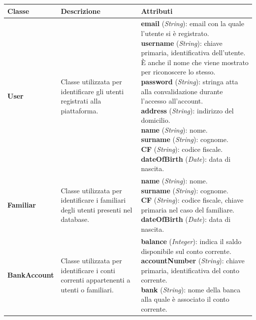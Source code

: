 \begin{longtable}{m{2.5cm}|m{4cm}|m{7.2cm}}

    \rowcolor{black!10}
    \textbf{Classe} & \textbf{Descrizione} & \textbf{Attributi} \\ \hline
    \endhead

    \textbf{User} & \raggedright Classe utilizzata per identificare gli utenti registrati alla piattaforma. &
    \parbox{7.2cm}{
        \textbf{email} (\textit{String}): email con la quale l'utente si è registrato. \\ 
        \textbf{username} (\textit{String}): chiave primaria, identificativa dell'utente. È anche il nome che viene mostrato per riconoscere lo stesso. \\
        \textbf{password} (\textit{String}): stringa atta alla convalidazione durante l'accesso all'account. \\
        \textbf{address} (\textit{String}): indirizzo del domicilio. \\
        \textbf{name} (\textit{String}): nome. \\
        \textbf{surname} (\textit{String}): cognome. \\
        \textbf{CF} (\textit{String}): codice fiscale. \\
        \textbf{dateOfBirth} (\textit{Date}): data di nascita.
    } \\ \hline

    \textbf{Familiar} & \raggedright Classe utilizzata per identificare i familiari degli utenti presenti nel database. &
    \parbox{7.2cm}{
        \textbf{name} (\textit{String}): nome. \\
        \textbf{surname} (\textit{String}): cognome. \\
        \textbf{CF} (\textit{String}): codice fiscale, chiave primaria nel caso del familiare. \\
        \textbf{dateOfBirth} (\textit{Date}): data di nascita.
    } \\ \hline

    \textbf{BankAccount} & \raggedright Classe utilizzata per identificare i conti correnti appartenenti a utenti o familiari. &
    \parbox{7.2cm}{
        \textbf{balance} (\textit{Integer}): indica il saldo disponibile sul conto corrente. \\
        \textbf{accountNumber} (\textit{String}): chiave primaria, identificativa del conto corrente. \\
        \textbf{bank} (\textit{String}): nome della banca alla quale è associato il conto corrente.
    } \\ \hline


\end{longtable}
